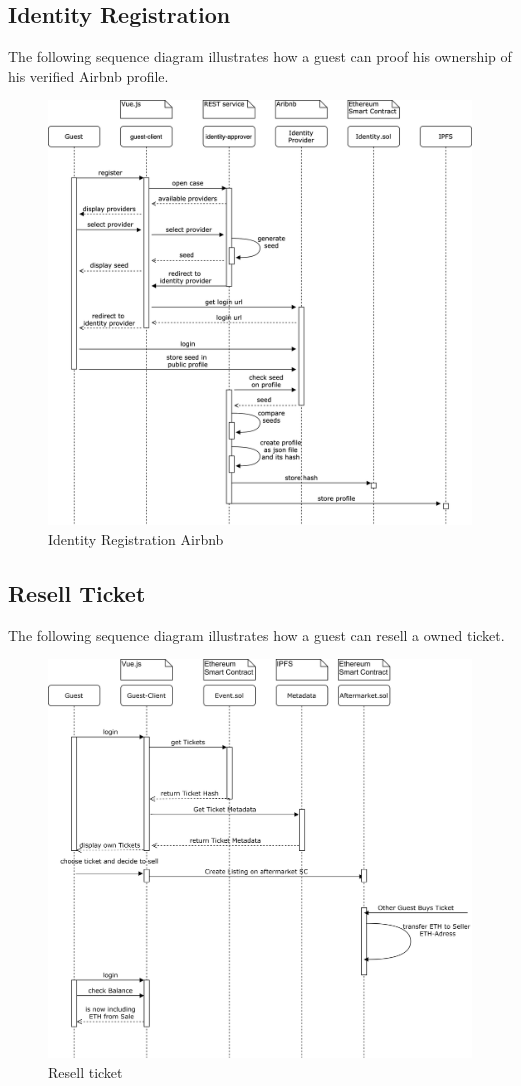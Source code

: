 \subsection{Identity Registration}
The following sequence diagram illustrates how a guest can proof his ownership of his verified Airbnb profile.

\begin{figure}[H]
    \centering
    \includegraphics[width=16cm]{design/diagrams/identy-registration-airbnb.png}
    \caption{Identity Registration Airbnb}
    \label{fig:identity-registration-airbnb}
\end{figure}

\subsection{Resell Ticket}
The following sequence diagram illustrates how a guest can resell a owned ticket.

\begin{figure}[H]
    \centering
    \includegraphics[width=16cm]{design/diagrams/Resell Ticket.png}
    \caption{Resell ticket}
    \label{fig:Resell-ticket}
\end{figure}
